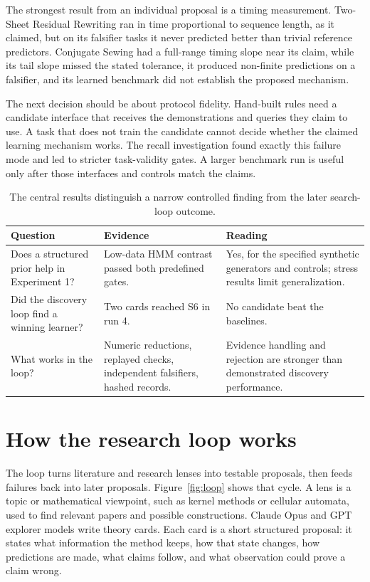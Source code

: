 The strongest result from an individual proposal is a timing measurement. Two-Sheet Residual Rewriting ran in time proportional to sequence length, as it claimed, but on its falsifier tasks it never predicted better than trivial reference predictors. Conjugate Sewing had a full-range timing slope near its claim, while its tail slope missed the stated tolerance, it produced non-finite predictions on a falsifier, and its learned benchmark did not establish the proposed mechanism.

The next decision should be about protocol fidelity. Hand-built rules need a candidate interface that receives the demonstrations and queries they claim to use. A task that does not train the candidate cannot decide whether the claimed learning mechanism works. The recall investigation found exactly this failure mode and led to stricter task-validity gates. A larger benchmark run is useful only after those interfaces and controls match the claims.

\begin{table}[ht]
\centering\small
\caption{The central results distinguish a narrow controlled finding from the later search-loop outcome.}
\begin{tabular}{p{3.1cm}p{5.1cm}p{5.4cm}}
\toprule
Question & Evidence & Reading \\
\midrule
Does a structured prior help in Experiment 1? & Low-data HMM contrast passed both predefined gates. & Yes, for the specified synthetic generators and controls; stress results limit generalization. \\
Did the discovery loop find a winning learner? & Two cards reached S6 in run 4. & No candidate beat the baselines. \\
What works in the loop? & Numeric reductions, replayed checks, independent falsifiers, hashed records. & Evidence handling and rejection are stronger than demonstrated discovery performance. \\
\bottomrule
\end{tabular}
\end{table}

\section{How the research loop works}

The loop turns literature and research lenses into testable proposals, then feeds failures back into later proposals. Figure~\ref{fig:loop} shows that cycle. A lens is a topic or mathematical viewpoint, such as kernel methods or cellular automata, used to find relevant papers and possible constructions. Claude Opus and GPT explorer models write theory cards. Each card is a short structured proposal: it states what information the method keeps, how that state changes, how predictions are made, what claims follow, and what observation could prove a claim wrong.

